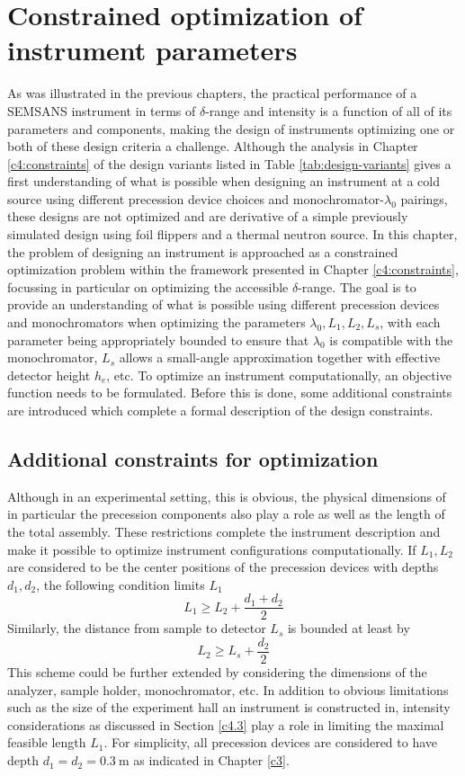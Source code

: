 \chapter{Constrained optimization of instrument parameters}
\label{chapter:optimization}
\label{c5:optimization}
As was illustrated in the previous chapters, the practical performance of a SEMSANS instrument in terms of $\delta$-range and intensity is a function of all of its parameters and components, making the design of instruments optimizing one or both of these design criteria a challenge. Although the analysis in Chapter \ref{c4:constraints} of the design variants listed in Table \ref{tab:design-variants} gives a first understanding of what is possible when designing an instrument at a cold source using different precession device choices and monochromator-$\lambda_0$ pairings, these designs are not optimized and are derivative of a simple previously simulated design \cite{bouwman2021b} using foil flippers and a thermal neutron source. In this chapter, the problem of designing an instrument is approached as a constrained optimization problem within the framework presented in Chapter \ref{c4:constraints}, focussing in particular on optimizing the accessible $\delta$-range. The goal is to provide an understanding of what is possible using different precession devices and monochromators when optimizing the parameters $\lambda_0, L_1, L_2, L_s$, with each parameter being appropriately bounded to ensure that $\lambda_0$ is compatible with the monochromator, $L_s$ allows a small-angle approximation together with effective detector height $h_e$, etc. 
To optimize an instrument computationally, an objective function needs to be formulated. Before this is done, some additional constraints are introduced which complete a formal description of the design constraints.

\section{Additional constraints for optimization}
\label{c5.1}
Although in an experimental setting, this is obvious, the physical dimensions of in particular the precession components also play a role as well as the length of the total assembly. These restrictions complete the instrument description and make it possible to optimize instrument configurations computationally. If $L_1, L_2$ are considered to be the center positions of the precession devices with depths $d_1, d_2$, the following condition limits $L_1$
$$L_1 \geq L_2 + \frac{d_1 + d_2}{2}$$
Similarly, the distance from sample to detector $L_s$ is bounded at least by
$$L_2 \geq L_s + \frac{d_2}{2}$$
This scheme could be further extended by considering the dimensions of the analyzer, sample holder, monochromator, etc. In addition to obvious limitations such as the size of the experiment hall an instrument is constructed in, intensity considerations as discussed in Section \ref{c4.3} play a role in limiting the maximal feasible length $L_1$. For simplicity, all precession devices are considered to have depth $d_1 = d_2 = \SI{0.3}{\meter}$ as indicated in Chapter \ref{c3}. 

